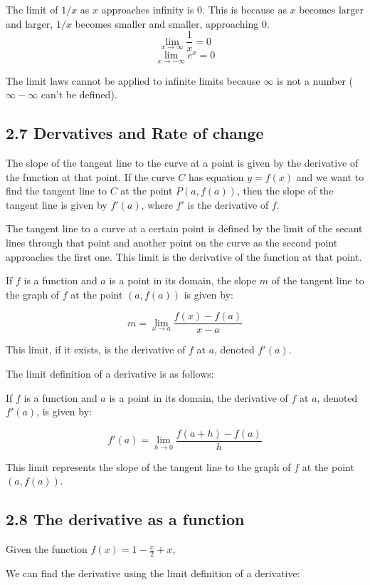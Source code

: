 \documentclass{article}
\begin{document}
The limit of \(1/x\) as \(x\) approaches infinity is 0. This is because as \(x\) becomes larger and larger, \(1/x\) becomes smaller and smaller, approaching 0.
\[\lim_{x \to \infty} \frac{1}{x} = 0\]
\[\lim_{x \to -\infty} e^x = 0\]

The limit laws cannot be applied to infinite limits because $\infty$ is not a number ($\infty - \infty$ can't be defined).

\subsection{2.7 Dervatives and Rate of change} 
The slope of the tangent line to the curve at a point is given by the derivative of the function at that point. If the curve \(C\) has equation \(y = f(x)\) and we want to find the tangent line to \(C\) at the point \(P(a, f(a))\), then the slope of the tangent line is given by \(f'(a)\), where \(f'\) is the derivative of \(f\).

The tangent line to a curve at a certain point is defined by the limit of the secant lines through that point and another point on the curve as the second point approaches the first one. This limit is the derivative of the function at that point.

If \(f\) is a function and \(a\) is a point in its domain, the slope \(m\) of the tangent line to the graph of \(f\) at the point \((a, f(a))\) is given by:

\[m = \lim_{x \to a} \frac{f(x) - f(a)}{x - a}\]

This limit, if it exists, is the derivative of \(f\) at \(a\), denoted \(f'(a)\).

The limit definition of a derivative is as follows:

If \(f\) is a function and \(a\) is a point in its domain, the derivative of \(f\) at \(a\), denoted \(f'(a)\), is given by:

\[f'(a) = \lim_{h \to 0} \frac{f(a + h) - f(a)}{h}\]

This limit represents the slope of the tangent line to the graph of \(f\) at the point \((a, f(a))\).

\subsection{2.8 The derivative as a function}

Given the function \(f(x) = 1 - \frac{x}{2} + x\),

We can find the derivative using the limit definition of a derivative:
\end{document}
